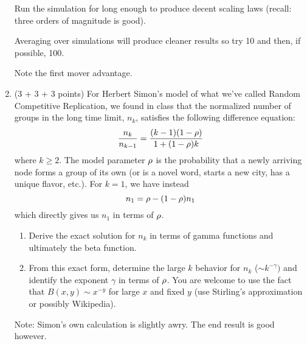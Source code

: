 \begin{enumerate}
  Run the simulation for long enough to produce decent scaling
  laws (recall: three orders of magnitude is good).
  
  Averaging over simulations will produce cleaner results
  so try 10 and then, if possible, 100.
  
  Note the first mover advantage.

  
   \solutionstart


   \solutionend

\item (3 + 3 + 3 points)
  For Herbert Simon's model of what
  we've called Random Competitive Replication,
  we found in class that the normalized number
  of groups in the long time limit, $n_{k}$, satisfies the following
  difference equation:
  \begin{equation}
    \label{eq:300.asn2nk}
    \frac{n_{k}}{n_{k-1}}
    =
    \frac{(k-1)(1-\rho)}
         {1+(1-\rho)k}
  \end{equation}
  where $k \ge 2$.
  The model parameter $\rho$ is the probability
  that a newly arriving node forms a group
  of its own (or is a novel word, starts a new
  city, has a unique flavor, etc.).
  For $k=1$, we have instead
  \begin{equation}
    \label{eq:300.asn2n1}
    n_{1}
    =
    \rho
    -(1-\rho) n_{1}
  \end{equation}
  which directly gives us $n_{1}$ in terms of $\rho$.

  \begin{enumerate}
  \item 
    Derive the exact solution for $n_{k}$ in terms
    of gamma functions and ultimately the
    beta function.  
  \item 
    From this exact form, determine
    the large $k$ behavior for $n_{k}$ ($\sim k^{-\gamma})$ and identify
    the exponent $\gamma$ in terms of $\rho$.
    You are welcome to use the fact that
    $B(x,y) \sim x^{-y}$ for large $x$ and fixed $y$
    (use Stirling's approximation or possibly Wikipedia).
  \end{enumerate}

  Note: Simon's own calculation is slightly awry. 
  The end result is good however.
  



\end{enumerate}
